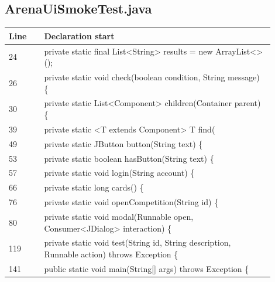 \subsection*{ArenaUiSmokeTest.java}
\begin{longtable}{p{0.12\linewidth}p{0.78\linewidth}}\toprule Line & Declaration start\\\midrule\endhead
24 & private static final List<String> results = new ArrayList<>();\\
26 & private static void check(boolean condition, String message) \{\\
30 & private static List<Component> children(Container parent) \{\\
39 & private static <T extends Component> T find(\\
49 & private static JButton button(String text) \{\\
53 & private static boolean hasButton(String text) \{\\
57 & private static void login(String account) \{\\
66 & private static long cards() \{\\
76 & private static void openCompetition(String id) \{\\
80 & private static void modal(Runnable open, Consumer<JDialog> interaction) \{\\
119 & private static void test(String id, String description, Runnable action) throws Exception \{\\
141 & public static void main(String[] args) throws Exception \{\\
\bottomrule\end{longtable}\normalsize